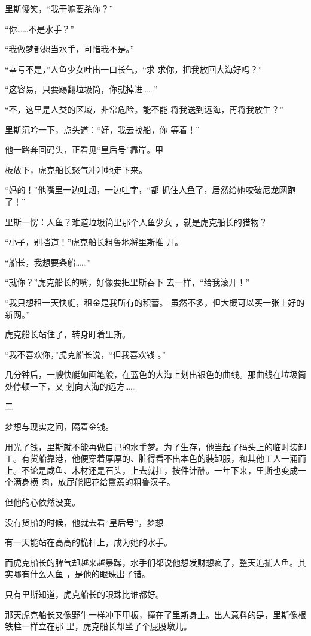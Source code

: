 \documentclass{article}
\begin{document}
里斯傻笑，“我干嘛要杀你？” 


“你……不是水手？” 


“我做梦都想当水手，可惜我不是。” 

“幸亏不是，”人鱼少女吐出一口长气，“求
求你，把我放回大海好吗？” 

“这容易，只要踢翻垃圾筒，你就掉进……”

“不，这里是人类的区域，非常危险。能不能
将我送到远海，再将我放生？” 

里斯沉吟一下，点头道：“好，我去找船，你
等着！” 

他一路奔回码头，正看见“皇后号”靠岸。甲
\newpage

板放下，虎克船长怒气冲冲地走下来。 

“妈的！”他嘴里一边吐烟，一边吐字，“都
抓住人鱼了，居然给她咬破尼龙网跑了！” 

里斯一愣：人鱼？难道垃圾筒里那个人鱼少女
，就是虎克船长的猎物？ 

“小子，别挡道！”虎克船长粗鲁地将里斯推
开。 


“船长，我想要条船……” 

“就你？”虎克船长的嘴，好像要把里斯吞下
去一样，“给我滚开！” 

“我只想租一天快艇，租金是我所有的积蓄。
虽然不多，但大概可以买一张上好的新网。” 


虎克船长站住了，转身盯着里斯。 

\newpage

“我不喜欢你，”虎克船长说，“但我喜欢钱
。” 

几分钟后，一艘快艇如画笔般，在蓝色的大海上划出银色的曲线。那曲线在垃圾筒处停顿一下，又
划向大海的远方…… 


二 


梦想与现实之间，隔着金钱。 

用光了钱，里斯就不能再做自己的水手梦。为了生存，他当起了码头上的临时装卸工。有货船靠港，他便穿着厚厚的、脏得看不出本色的装卸服，和其他工人一涌而上。不论是咸鱼、木材还是石头，上去就扛，按件计酬。一年下来，里斯也变成一个满身横
肉，放屁能把花给熏蔫的粗鲁汉子。 


但他的心依然没变。 

没有货船的时候，他就去看“皇后号”，梦想
\newpage

有一天能站在高高的桅杆上，成为她的水手。 

而虎克船长的脾气却越来越暴躁，水手们都说他想发财想疯了，整天追捕人鱼。其实哪有什么人鱼
，是他的眼珠出了错。 


只有里斯知道，虎克船长的眼珠比谁都好。 

那天虎克船长又像野牛一样冲下甲板，撞在了里斯身上。出人意料的是，里斯像根铁柱一样立在那
里，虎克船长却坐了个屁股墩儿。 
\end{document}
